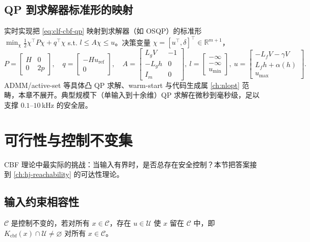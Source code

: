\subsection{QP 到求解器标准形的映射}

实时实现把 \cref{eq:clf-cbf-qp} 映射到求解器（如 OSQP）的标准形 $\min_\chi\tfrac12\chi^\top P\chi+q^\top\chi$ s.t. $l\le A\chi\le u$。决策变量 $\chi=[u^\top,\delta]^\top\in\mathbb R^{m+1}$，
\begin{equation}
P=\begin{bmatrix}H&0\\0&2p\end{bmatrix},\quad q=\begin{bmatrix}-H u_{\mathrm{ref}}\\0\end{bmatrix},\quad
A=\begin{bmatrix}L_gV&-1\\-L_gh&0\\I_m&0\end{bmatrix},\ l=\begin{bmatrix}-\infty\\-\infty\\u_{\min}\end{bmatrix},\ u=\begin{bmatrix}-L_fV-\gamma V\\L_fh+\alpha(h)\\u_{\max}\end{bmatrix}.
\label{eq:qp-cbf-standard}
\end{equation}
ADMM/active-set 等具体凸 QP 求解、warm-start 与代码生成属 \cref{ch:nlopt} 范畴，本章不展开。典型规模下（单输入到十余维）QP 求解在微秒到毫秒级，足以支撑 $0.1$–$10$\,kHz 的安全层。

\section{可行性与控制不变集}
\label{sec:cbf-feasibility}

CBF 理论中最实际的挑战：当输入有界时，是否总存在安全控制？本节把答案接到 \cref{ch:hj-reachability} 的可达性理论。

\subsection{输入约束相容性}

\begin{definition}[控制不变集]\label{def:control-invariant}
$\mathcal C$ 是控制不变的，若对所有 $x\in\mathcal C$，存在 $u\in\mathcal U$ 使 $x$ 留在 $\mathcal C$ 中，即 $K_{\mathrm{cbf}}(x)\cap\mathcal U\neq\varnothing$ 对所有 $x\in\mathcal C$。
\end{definition}

